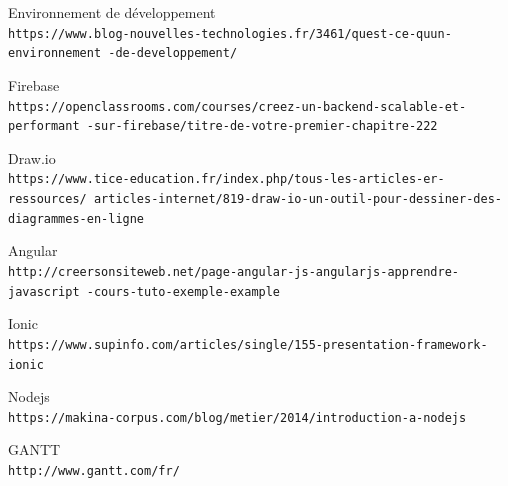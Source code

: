 \documentclass[11pt,a4paper,oneside]{book}
\begin{document}
\begin{thebibliography}{9}
	Environnement de développement
	\\\texttt{https://www.blog-nouvelles-technologies.fr/3461/quest-ce-quun-environnement
		-de-developpement/}
	
	Firebase 
	\\\texttt{https://openclassrooms.com/courses/creez-un-backend-scalable-et-performant
		-sur-firebase/titre-de-votre-premier-chapitre-222}
	
	Draw.io
	\\\texttt{https://www.tice-education.fr/index.php/tous-les-articles-er-ressources/
		articles-internet/819-draw-io-un-outil-pour-dessiner-des-diagrammes-en-ligne}
	
	Angular
	\\\texttt{http://creersonsiteweb.net/page-angular-js-angularjs-apprendre-javascript
		-cours-tuto-exemple-example}
	
	Ionic
	\\\texttt{https://www.supinfo.com/articles/single/155-presentation-framework-ionic}
	
	Nodejs
	\\\texttt{https://makina-corpus.com/blog/metier/2014/introduction-a-nodejs}
	
	GANTT
	\\\texttt{http://www.gantt.com/fr/}
	
\end{thebibliography}
				
\end{document}
